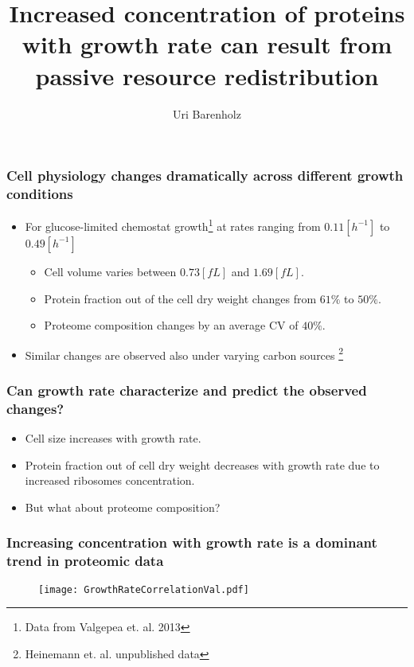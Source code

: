 \documentclass{beamer}
\title{Increased concentration of proteins with growth rate can result from passive resource redistribution}
\author{Uri Barenholz}
\begin{document}

\maketitle
\begin{frame}
\frametitle{Cell physiology changes dramatically across different growth conditions}
\begin{itemize}
\item For glucose-limited chemostat growth\footnote{Data from Valgepea et. al. 2013} at rates ranging from $0.11 [h^{-1}]$ to $0.49 [h^{-1}]$
\begin{itemize}
\item Cell volume varies between $0.73 [fL]$ and $1.69 [fL]$.
\item Protein fraction out of the cell dry weight changes from $61\%$ to $50\%$.
\item Proteome composition changes by an average CV of $40\%$.
\end{itemize}
\item Similar changes are observed also under varying carbon sources
\footnote{Heinemann et. al. unpublished data}
\end{itemize}
\end{frame}

\begin{frame}
\frametitle{Can growth rate characterize and predict the observed changes?}
\begin{itemize}
\item Cell size increases with growth rate.
\item Protein fraction out of cell dry weight decreases with growth rate due to increased ribosomes concentration.
\item But what about proteome composition?
\end{itemize}
\end{frame}

\begin{frame}
\frametitle{Increasing concentration with growth rate is a dominant trend in proteomic data}
\begin{figure}[h!]
\centering
\texttt{[image: GrowthRateCorrelationVal.pdf]}
\end{figure}
\end{frame}
\end{document}
